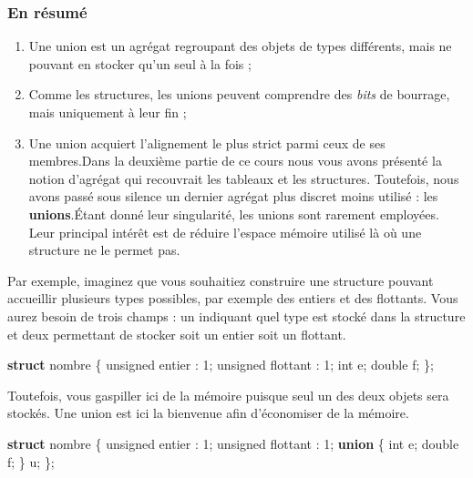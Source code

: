 \documentclass[]{article}
\date{}
\newenvironment{Shaded}{}{}
\newcommand{\KeywordTok}[1]{\textcolor[rgb]{0.00,0.44,0.13}{\textbf{{#1}}}}
\newcommand{\DataTypeTok}[1]{\textcolor[rgb]{0.56,0.13,0.00}{{#1}}}
\newcommand{\DecValTok}[1]{\textcolor[rgb]{0.25,0.63,0.44}{{#1}}}
\newcommand{\NormalTok}[1]{{#1}}
\providecommand{\tightlist}{%
  \setlength{\itemsep}{0pt}\setlength{\parskip}{0pt}}
\begin{document}
{
\setcounter{tocdepth}{3}
\tableofcontents
}
\subsubsection{En résumé}\label{en-ruxe9sumuxe9}

\begin{enumerate}
\def\labelenumi{\arabic{enumi}.}
\tightlist
\item
  Une union est un agrégat regroupant des objets de types différents,
  mais ne pouvant en stocker qu'un seul à la fois ;
\item
  Comme les structures, les unions peuvent comprendre des \emph{bits} de
  bourrage, mais uniquement à leur fin ;
\item
  Une union acquiert l'alignement le plus strict parmi ceux de ses
  membres.Dans la deuxième partie de ce cours nous vous avons présenté
  la notion d'agrégat qui recouvrait les tableaux et les structures.
  Toutefois, nous avons passé sous silence un dernier agrégat plus
  discret moins utilisé : les \textbf{unions}.Étant donné leur
  singularité, les unions sont rarement employées. Leur principal
  intérêt est de réduire l'espace mémoire utilisé là où une structure ne
  le permet pas.
\end{enumerate}

Par exemple, imaginez que vous souhaitiez construire une structure
pouvant accueillir plusieurs types possibles, par exemple des entiers et
des flottants. Vous aurez besoin de trois champs : un indiquant quel
type est stocké dans la structure et deux permettant de stocker soit un
entier soit un flottant.

\begin{Shaded}
\begin{Highlighting}[]
\KeywordTok{struct} \NormalTok{nombre}
\NormalTok{\{}
    \DataTypeTok{unsigned} \NormalTok{entier : }\DecValTok{1}\NormalTok{;}
    \DataTypeTok{unsigned} \NormalTok{flottant : }\DecValTok{1}\NormalTok{;}
    \DataTypeTok{int} \NormalTok{e;}
    \DataTypeTok{double} \NormalTok{f;}
\NormalTok{\};}
\end{Highlighting}
\end{Shaded}

Toutefois, vous gaspiller ici de la mémoire puisque seul un des deux
objets sera stockés. Une union est ici la bienvenue afin d'économiser de
la mémoire.

\begin{Shaded}
\begin{Highlighting}[]
\KeywordTok{struct} \NormalTok{nombre}
\NormalTok{\{}
    \DataTypeTok{unsigned} \NormalTok{entier : }\DecValTok{1}\NormalTok{;}
    \DataTypeTok{unsigned} \NormalTok{flottant : }\DecValTok{1}\NormalTok{;}
    \KeywordTok{union}
    \NormalTok{\{}
        \DataTypeTok{int} \NormalTok{e;}
        \DataTypeTok{double} \NormalTok{f;}
    \NormalTok{\} u;}
\NormalTok{\};}
\end{Highlighting}
\end{Shaded}
\end{document}
